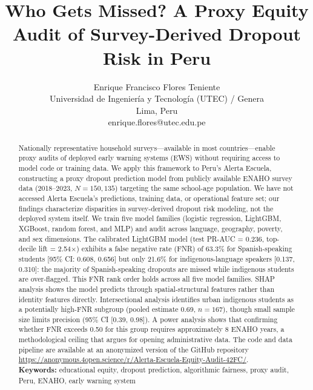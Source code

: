 \documentclass[notitlepage,12pt]{jedm}
\begin{document}
\title{Who Gets Missed? A Proxy Equity Audit of Survey-Derived Dropout Risk in Peru}
\date{} %

\author{{\large Enrique Francisco Flores Teniente}\\Universidad de Ingenier\'{i}a y Tecnolog\'{i}a (UTEC) / Genera\\Lima, Peru\\enrique.flores@utec.edu.pe}

\maketitle

\begin{abstract}
Nationally representative household surveys---available in most countries---enable proxy audits of deployed early warning systems (EWS) without requiring access to model code or training data. We apply this framework to Peru's Alerta Escuela, constructing a proxy dropout prediction model from publicly available ENAHO survey data (2018--2023, $N=150{,}135$) targeting the same school-age population. We have not accessed Alerta Escuela's predictions, training data, or operational feature set; our findings characterize disparities in survey-derived dropout risk modeling, not the deployed system itself. We train five model families (logistic regression, LightGBM, XGBoost, random forest, and MLP) and audit across language, geography, poverty, and sex dimensions. The calibrated LightGBM model (test PR-AUC = 0.236, top-decile lift = 2.54$\times$) exhibits a false negative rate (FNR) of 63.3\% for Spanish-speaking students [95\% CI: 0.608, 0.656] but only 21.6\% for indigenous-language speakers [0.137, 0.310]: the majority of Spanish-speaking dropouts are missed while indigenous students are over-flagged. This FNR rank order holds across all five model families. SHAP analysis shows the model predicts through spatial-structural features rather than identity features directly. Intersectional analysis identifies urban indigenous students as a potentially high-FNR subgroup (pooled estimate 0.69, $n=167$), though small sample size limits precision (95\% CI [0.39, 0.98]). A power analysis shows that confirming whether FNR exceeds 0.50 for this group requires approximately 8 ENAHO years, a methodological ceiling that argues for opening administrative data. The code and data pipeline are available at an anonymized version of the GitHub repository \url{https://anonymous.4open.science/r/Alerta-Escuela-Equity-Audit-42FC/}. \\

{\parindent0pt
\textbf{Keywords:} educational equity, dropout prediction, algorithmic fairness, proxy audit, Peru, ENAHO, early warning system
}
\end{abstract}
\end{document}

